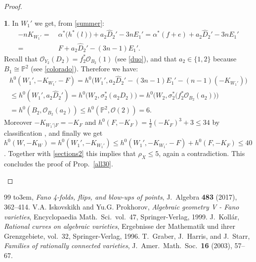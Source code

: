 \documentclass[10pt,a4paper]{amsart}
\providecommand{\bysame}{\leavevmode\hbox to3em{\hrulefill}\thinspace}
\theoremstyle{definition}
\newtheorem{prg}[thm]{}
\numberwithin{figure}{section}
\numberwithin{table}{section}
\newcommand{\ol}{\mathcal{O}}
\newcommand{\wi}{\widehat}
\newcommand{\pr}{\mathbb{P}}
\begin{document}
\begin{proof}
\begin{prg}
In $W_1'$ we get, from \eqref{summer}: 
 \begin{align*}  -nK_{W_1'}=& \ \alpha^*\bigl(h^*(l)\bigr)+a_2\wi{D}_2'-3nE_1'=
                              \alpha^*(f+e)+a_2\wi{D}_2'-3nE_1'\\
   = & \  F+a_2\wi{D}_2'-(3n-1)E_1'.
 \end{align*}
 Recall that $\ol_{Y_2}(D_2)=f_2^*\ol_{B_2}(1)$ (see \ref{duo}), and
 that $a_2\in\{1,2\}$ because $B_1\cong\pr^2$ (see \ref{colorado}). 
  Therefore we have:
  \begin{gather*}
    h^0(W_1',-K_{W_1'}-F)= h^0\bigl(W_1',a_2\wi{D}_2'-(3n-1)E_1'-(n-1)(-K_{W_1'})\bigr)\\ \leq  h^0(W_1',a_2\wi{D}_2')
    =h^0\bigl(W_2,\sigma_2^*(a_2D_2)\bigr)
  =h^0\bigl(W_2,\sigma_2^*\bigl(f_2^*\ol_{B_2}(a_2)\bigr)\bigr)\\ =h^0(B_2,\ol_{B_2}(a_2))\leq  h^0(\pr^2,\ol(2))=6.
\end{gather*}
Moreover $-K_{W_1'|F}=-K_F$ and $h^0(F,-K_F)=\frac{1}{2}(-K_F)^3+3\leq 34$ by classification \cite[Ch.~12]{fanoEMS}, and finally we get $h^0(W,-K_W)=h^0(W_1',-K_{W_1'})\leq  h^0(W_1',-K_{W_1'}-F)+h^0(F,-K_F)\leq 40$. Together with \eqref{sections2}
this implies that $\rho_X\leq 5$, again a contradiction. This concludes the proof of Prop.~\ref{all30}.\qedhere
\end{prg}
\end{proof}

\begin{thebibliography}{99}
 \bysame, \emph{{F}ano 4-folds, flips, and blow-ups of points}, J.~Algebra
  \textbf{483} (2017), 362--414.
 V.A. Iskovskikh and Yu.G. Prokhorov, \emph{Algebraic geometry {V} - {F}ano
  varieties}, Encyclopaedia Math.\ Sci.\, vol.~47, Springer-Verlag, 1999.
 J.~Koll{\'a}r, \emph{Rational curves on algebraic varieties}, Ergebnisse der
  Mathematik und ihrer Grenzgebiete, vol.~32, Springer-Verlag, 1996.
 T.~Graber, J.~Harris, and J.~Starr, \emph{Families of rationally connected
  varieties}, J.\ Amer.\ Math.\ Soc.\ \textbf{16} (2003), 57--67.
\end{thebibliography}
\end{document}
